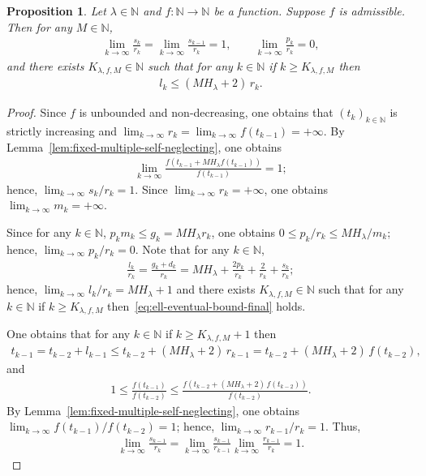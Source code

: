 \documentclass[12pt,reqno]{amsart}
\theoremstyle{definition}
\theoremstyle{plain}
\newtheorem{prop}{Proposition}
\begin{document}
\begin{prop}
\label{prop:scale-inputs-final}
Let $\lambda\in\mathbb{N}$ and $f:\mathbb{N}\to\mathbb{N}$ be a function. 
Suppose $f$ is admissible. Then for any $M\in\mathbb{N}$,
\begin{align}
\label{eq:scale-inputs-final}
    \lim_{k\to\infty}\frac{s_k}{r_k}
    =\lim_{k\to\infty}\frac{s_{k-1}}{r_k}
    =1,
    \qquad
    \lim_{k\to\infty}\frac{p_k}{r_k}=0,
\end{align}
and there exists $K_{\lambda,f,M}\in\mathbb{N}$ such that for any $k\in\mathbb{N}$ if $k\geq K_{\lambda,f,M}$ then
\begin{align}
\label{eq:ell-eventual-bound-final}
    l_k\leq (MH_\lambda+2)\,r_k.
\end{align}
\end{prop}
\begin{proof}
Since $f$ is unbounded and non-decreasing, one obtains that $(t_k)_{k\in\mathbb{N}}$ is strictly increasing and $\lim_{k\to\infty}r_k=\lim_{k\to\infty}f(t_{k-1})=+\infty$. By Lemma~\ref{lem:fixed-multiple-self-neglecting}, one obtains
\begin{align*}
    \lim_{k\to\infty}\frac{f(t_{k-1}+MH_\lambda f(t_{k-1}))}{f(t_{k-1})}=1;
\end{align*}
hence, $\lim_{k\to\infty}{s_k}/{r_k}=1$. Since $\lim_{k\to\infty}r_k=+\infty$, one obtains $\lim_{k\to\infty}m_k=+\infty$.

Since for any $k\in\mathbb{N}$, $p_km_k\leq g_k=MH_\lambda r_k$, one obtains $0\leq {p_k}/{r_k}\leq {MH_\lambda}/{m_k}$; hence, $\lim_{k\to\infty}{p_k}/{r_k}=0$. Note that for any $k\in\mathbb{N}$,
\begin{align*}
    \frac{l_k}{r_k}
    =
    \frac{g_k+d_k}{r_k}
    =
    MH_\lambda+\frac{2p_k}{r_k}+\frac{2}{r_k}+\frac{s_k}{r_k};
\end{align*}
hence, $\lim_{k\to\infty}{l_k}/{r_k}=MH_\lambda+1$ and there exists $K_{\lambda,f,M}\in\mathbb{N}$ such that for any $k\in\mathbb{N}$ if $k\geq K_{\lambda,f,M}$ then~\eqref{eq:ell-eventual-bound-final} holds.

One obtains that for any $k\in\mathbb{N}$ if $k\geq K_{\lambda,f,M}+1$ then 
\begin{align*}
    t_{k-1}
    =t_{k-2}+l_{k-1}
    \leq t_{k-2}+(MH_\lambda+2)\,r_{k-1}
    =t_{k-2}+(MH_\lambda+2)\,f(t_{k-2}),
\end{align*}
and
\begin{align*}
    1\leq \frac{f(t_{k-1})}{f(t_{k-2})}\le
    \frac{f(t_{k-2}+(MH_\lambda+2)\,f(t_{k-2}))}{f(t_{k-2})}.
\end{align*}
By Lemma~\ref{lem:fixed-multiple-self-neglecting}, one obtains $\lim_{k\to\infty}{f(t_{k-1})}/{f(t_{k-2})}=1$; hence, $\lim_{k\to\infty}{r_{k-1}}/{r_k}=1$. Thus,
\begin{align*}
    \lim_{k\to\infty}\frac{s_{k-1}}{r_k}
    =\lim_{k\to\infty}\frac{s_{k-1}}{r_{k-1}}\lim_{k\to\infty}\frac{r_{k-1}}{r_k}
    =1.
\end{align*}
\end{proof}
\end{document}
